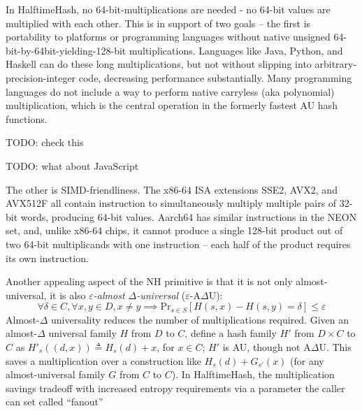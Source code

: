 \documentclass[sigconf, nonacm]{acmart}
\begin{document}
In HalftimeHash, no 64-bit-mul\-ti\-pli\-ca\-tions are needed - no 64-bit values are multiplied with each other.
This is in support of two goals --
the first is portability to platforms or programming languages without native unsigned 64-bit-by-64bit-yielding-128-bit multiplications.
Languages like Java, Python, and Haskell can do these long multiplications, but not without slipping into arbitrary-precision-integer code, decreasing performance substantially.
Many programming languages do not include a way to perform native carryless (aka polynomial) multiplication, which is the central operation in the formerly fastest AU hash functions. \cite{umash,clhash}

TODO: check this

TODO: what about JavaScript

The other is SIMD-friendliness.
The x86-64 ISA extensions SSE2, AVX2, and AVX512F all contain instruction to simultaneously multiply multiple pairs of 32-bit words, producing 64-bit values.
Aarch64 has similar instructions in the NEON set, and, unlike x86-64 chips, it cannot produce a single 128-bit product out of two 64-bit multiplicands with one instruction -- each half of the product requires its own instruction.



Another appealing aspect of the NH primitive is that it is not only almost-universal, it is also {\em$ \varepsilon$-almost $\Delta$-universal} ($\varepsilon$-A$\Delta$U):
\[\forall \delta \in C, \forall x,y \in D, x \neq y \implies \mathrm{Pr}_{s \in S}[H(s, x) - H(s, y) = \delta] \leq \varepsilon \]
Almost-$\Delta$ universality reduces the number of multiplications required.
Given an almost-$\Delta$ universal family $H$ from $D$ to $C$, define a hash family $H'$ from $D \times C$ to $C$ as $H'_s ((d, x)) \triangleq H_s(d) + x$, for $x \in C$; $H'$ is AU, though not A$\Delta$U.
This saves a multiplication over a construction like $H_s(d) + G_{s'}(x)$ (for any almost-universal family $G$ from $C$ to $C$).
In HalftimeHash, the multiplication savings tradeoff with increased entropy requirements via a parameter the caller can set called ``fanout''
\end{document}
